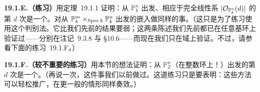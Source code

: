 \textbf{19.1.E.（练习）}\quad 用\mbox{定理~19.1.1} 证明：从 $\mathbb{P}^n_k$ 出发、相应于完全线性系 $|\mathcal{O}_{\mathbb{P}^n_k}(d)|$ 的第 $d$ 次\trVeroneseEmbedding{}是一个\trClosedEmbedding。对从 $\mathbb{P}^m_k\times_{\operatorname{Spec} k}\mathbb{P}^n_k$ 出发的\trSegre{}嵌入做同样的事。（这只是为了练习使用这个判别法。它比我们先前的结果要弱；这两条陈述我们先前都已在任意基环上验证过——分别在\mbox{注记~9.3.8} 与 \S10.6——而现在我们只在域上验证。不过，请参看下面的\mbox{练习~19.1.F}。）

\textbf{19.1.F.（较不重要的练习）}\quad 用本节的想法证明：从 $\mathbb{P}^n_{\mathbb{Z}}$（在整数环上！）出发的第 $d$ 次\trVeroneseEmbedding{}是一个\trClosedEmbedding。（再说一次，这件事我们以前做过。这道练习只是要表明：这些方法可以轻松推广，在更一般的情形同样奏效。）
